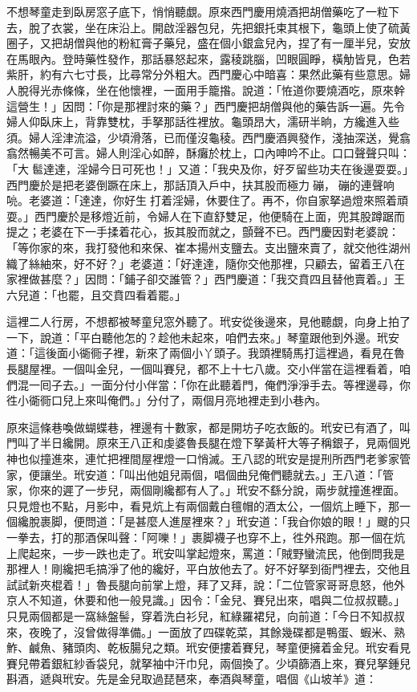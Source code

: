 不想琴童走到臥房窓子底下，悄悄聽覷。原來西門慶用燒酒把胡僧藥吃了一粒下去，脫了衣裳，坐在床沿上。開啟淫器包兒，先把銀托束其根下，龜頭上使了硫黃圈子，又把胡僧與他的粉紅膏子藥兒，盛在個小銀盒兒內，捏了有一厘半兒，安放在馬眼內。登時藥性發作，那話暴怒起來，露稜跳腦，凹眼圓睜，橫觔皆見，色若紫肝，約有六七寸長，比尋常分外粗大。西門慶心中暗喜：果然此藥有些意思。婦人脫得光赤條條，坐在他懷裡，一面用手籠揝。說道：「恠道你要燒酒吃，原來幹這營生！」因問：「你是那裡討來的藥？」西門慶把胡僧與他的藥告訴一遍。先令婦人仰臥床上，背靠雙枕，手拏那話徃裡放。龜頭昂大，濡研半晌，方纔進入些須。婦人淫津流溢，少頃滑落，已而僅沒龜稜。西門慶酒興發作，淺抽深送，覺翕翕然暢美不可言。婦人則淫心如醉，酥癱於枕上，口內呻吟不止。口口聲聲只叫：「大𩫻䯲達達，淫婦今日可死也！」又道：「我央及你，好歹留些功夫在後邊耍耍。」{}西門慶於是把老婆倒蹶在床上，那話頂入戶中，扶其股而極力𢵞磞，𢵞磞的連聲响喨。老婆道：「達達，你好生𢵞打着淫婦，休要住了。再不，你自家拏過燈來照着頑耍。」西門慶於是移燈近前，令婦人在下直舒雙足，他便騎在上面，兜其股蹲踞而提之；老婆在下一手揉着花心，扳其股而就之，顫聲不已。西門慶因對老婆說：「等你家的來，我打發他和來保、崔本揚州支鹽去。支出鹽來賣了，就交他徃湖州織了絲紬來，好不好？」老婆道：「好達達，隨你交他那裡，只顧去，留着王八在家裡做甚麼？」因問：「鋪子卻交誰管？」西門慶道：「我交賁四且替他賣着。」王六兒道：「也罷，且交賁四看着罷。」

這裡二人行房，不想都被琴童兒窓外聽了。玳安從後邊來，見他聽覷，向身上拍了一下，說道：「平白聽他怎的？趁他未起來，咱們去來。」琴童跟他到外邊。玳安道：「這後面小衚衕子裡，新來了兩個小丫頭子。我頭裡騎馬打這裡過，看見在魯長腿屋裡。一個叫金兒，一個叫賽兒，都不上十七八歲。交小伴當在這裡看着，咱們混一囘子去。」一面分付小伴當：「你在此聽着門，俺們淨淨手去。等裡邊尋，你徃小衚衕口兒上來叫俺們。」分付了，兩個月亮地裡走到小巷內。

原來這條巷喚做蝴蝶巷，裡邊有十數家，都是開坊子吃衣飯的。玳安已有酒了，叫門叫了半日纔開。原來王八正和虔婆魯長腿在燈下拏黃杆大等子稱銀子，見兩個兇神也似撞進來，連忙把裡間屋裡燈一口悄滅。王八認的玳安是提刑所西門老爹家管家，便讓坐。玳安道：「叫出他姐兒兩個，唱個曲兒俺們聽就去。」王八道：「管家，你來的遲了一步兒，兩個剛纔都有人了。」玳安不繇分說，兩步就撞進裡面。只見燈也不點，月影中，看見炕上有兩個戴白氊帽的酒太公，一個炕上睡下，那一個纔脫裹脚，便問道：「是甚麼人進屋裡來？」玳安道：「我㒲你娘的眼！」颼的只一拳去，打的那酒保叫聲：「阿嚛！」裹脚襪子也穿不上，徃外飛跑。那一個在炕上爬起來，一步一跌也走了。玳安叫掌起燈來，罵道：「賊野蠻流民，他倒問我是那裡人！剛纔把毛搞淨了他的纔好，平白放他去了。好不好拏到衙門裡去，交他且試試新夾棍着！」魯長腿向前掌上燈，拜了又拜，說：「二位管家哥哥息怒，他外京人不知道，休要和他一般見識。」因令：「金兒、賽兒出來，唱與二位叔叔聽。」只見兩個都是一窩絲盤髻，穿着洗白衫兒，紅綠羅裙兒，向前道：「今日不知叔叔來，夜晚了，沒曾做得準備。」一面放了四碟乾菜，其餘幾碟都是鴨蛋、蝦米、熟鮓、鹹魚、豬頭肉、乾板腸兒之類。{}玳安便摟着賽兒，琴童便擁着金兒。玳安看見賽兒帶着銀紅紗香袋兒，就拏袖中汗巾兒，兩個換了。少頃篩酒上來，賽兒拏鍾兒斟酒，遞與玳安。先是金兒取過琵琶來，奉酒與琴童，唱個《山坡羊》道：

